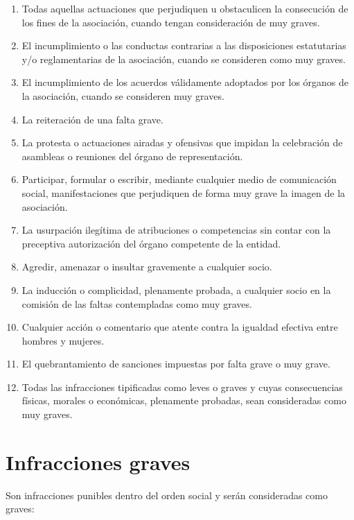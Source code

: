 \documentclass[a4paper, 12pt, oneside]{book}
\begin{document}
\begin{enumerate}
    \item Todas aquellas actuaciones que perjudiquen u obstaculicen la consecución de los fines de la asociación, cuando tengan consideración de muy graves.  
    \item El incumplimiento o las conductas contrarias a las disposiciones estatutarias y/o reglamentarias de la asociación, cuando se consideren como muy graves.  
    \item El incumplimiento de los acuerdos válidamente adoptados por los órganos de la asociación, cuando se consideren muy graves.  
    \item La reiteración de una falta grave.  
    \item La protesta o actuaciones airadas y ofensivas que impidan la celebración de asambleas o reuniones del órgano de representación.  
    \item Participar, formular o escribir, mediante cualquier medio de comunicación social, manifestaciones que perjudiquen de forma muy grave la imagen de la asociación.  
    \item La usurpación ilegítima de atribuciones o competencias sin contar con la preceptiva autorización del órgano competente de la entidad.  
    \item Agredir, amenazar o insultar gravemente a cualquier socio.  
    \item La inducción o complicidad, plenamente probada, a cualquier socio en la comisión de las faltas contempladas como muy graves.  
    \item Cualquier acción o comentario que atente contra la igualdad efectiva entre hombres y mujeres.  
    \item El quebrantamiento de sanciones impuestas por falta grave o muy grave.  
    \item Todas las infracciones tipificadas como leves o graves y cuyas consecuencias físicas, morales o económicas, plenamente probadas, sean consideradas como muy graves.
\end{enumerate}

\section{Infracciones graves}

Son infracciones punibles dentro del orden social y serán consideradas como graves:
\end{document}
